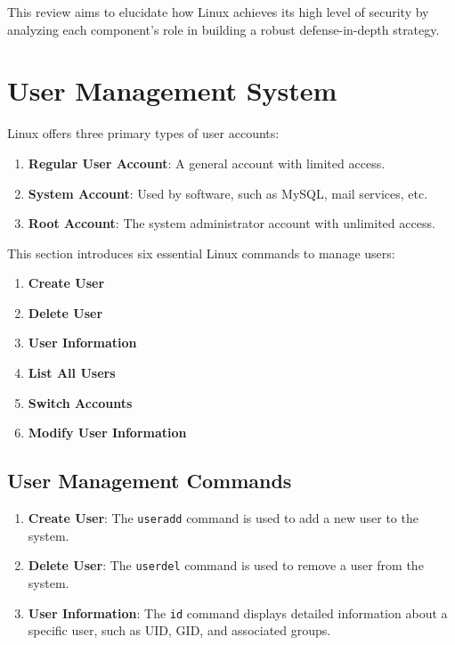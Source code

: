 \documentclass[conference]{IEEEtran}
\begin{document}
This review aims to elucidate how Linux achieves its high level of security by analyzing each component's role in building a robust defense-in-depth strategy.


\section{User Management System}

Linux offers three primary types of user accounts:

\begin{enumerate}
    \item \textbf{Regular User Account}: A general account with limited access.
    \item \textbf{System Account}: Used by software, such as MySQL, mail services, etc.
    \item \textbf{Root Account}: The system administrator account with unlimited access.
\end{enumerate}

This section introduces six essential Linux commands to manage users:

\begin{enumerate}
    \item \textbf{Create User}
    \item \textbf{Delete User}
    \item \textbf{User Information}
    \item \textbf{List All Users}
    \item \textbf{Switch Accounts}
    \item \textbf{Modify User Information}
\end{enumerate}

\subsection{User Management Commands}

\begin{enumerate}
    \item \textbf{Create User}: The \texttt{useradd} command is used to add a new user to the system.
    \item \textbf{Delete User}: The \texttt{userdel} command is used to remove a user from the system.
    \item \textbf{User Information}: The \texttt{id} command displays detailed information about a specific user, such as UID, GID, and associated groups.
\end{enumerate}
\end{document}
